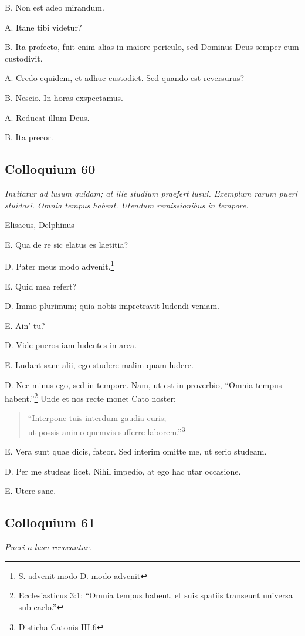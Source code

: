 \documentclass{article}
\begin{document}
B. Non est adeo mirandum.

A. Itane tibi videtur?

B. Ita profecto, fuit enim alias in maiore periculo, sed Dominus Deus semper eum custodivit.

A. Credo equidem, et adhuc custodiet. Sed quando est reversurus?

B. Nescio. In horas exspectamus.

A. Reducat illum Deus.

B. Ita precor.

\subsection{Colloquium 60}
\emph{Invitatur ad lusum quidam; at ille studium praefert lusui. Exemplum rarum pueri stuidosi. Omnia tempus habent. Utendum remissionibus in tempore.}

Elisaeus, Delphinus

E. Qua de re sic elatus es laetitia?

D. Pater meus modo advenit.\footnote{S. advenit modo D. modo advenit}

E. Quid mea refert?

D. Immo plurimum; quia nobis impretravit ludendi veniam.

E. Ain' tu?

D. Vide pueros iam ludentes in area.

E. Ludant sane alii, ego studere malim quam ludere.

D. Nec minus ego, sed in tempore. Nam, ut est in proverbio, ``Omnia tempus habent.''\footnote{Ecclesiasticus 3:1: ``Omnia tempus habent, et suis spatiis transeunt universa sub caelo.''} Unde et nos recte monet Cato noster:\begin{verse} ``Interpone tuis interdum gaudia curis;\\ut possis animo quemvis sufferre laborem.''\footnote{Disticha Catonis III.6}\end{verse}

E. Vera sunt quae dicis, fateor. Sed interim omitte me, ut serio studeam.

D. Per me studeas licet. Nihil impedio, at ego hac utar occasione.

E. Utere sane.

\subsection{Colloquium 61}
\emph{Pueri a lusu revocantur.}
\end{document}
